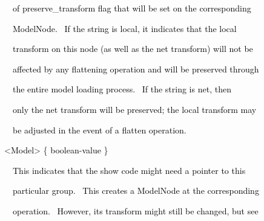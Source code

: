 \documentclass[a4paper]{article}
\newcommand\textstyleOOoComputerKeyWord[1]{\textrm{\textcolor[rgb]{0.0,0.0,0.5019608}{#1}}}
\newcommand\textstyleOOoAssemblerSpecialChar[1]{\textrm{\textcolor[rgb]{0.0,0.5019608,0.0}{#1}}}
\newcommand\textstyleOOoAssemblerIdent[1]{\textrm{\textcolor{black}{#1}}}
\begin{document}
{\color{black}
\textstyleOOoComputerKeyWord{\textcolor{black}{\ \ \ \ of preserve\_transform flag that will be set on the
corresponding}}}

{\color{black}
\textstyleOOoComputerKeyWord{\textcolor{black}{\ \ \ \ ModelNode. \ If the string is
{\textquotedbl}local{\textquotedbl}, it indicates that the local}}}

{\color{black}
\textstyleOOoComputerKeyWord{\textcolor{black}{\ \ \ \ transform on this node (as well as the net transform) will not
be}}}

{\color{black}
\textstyleOOoComputerKeyWord{\textcolor{black}{\ \ \ \ affected by any flattening operation and will be preserved
through}}}

{\color{black}
\textstyleOOoComputerKeyWord{\textcolor{black}{\ \ \ \ the entire model loading process. \ If the string is
{\textquotedbl}net{\textquotedbl}, then}}}

{\color{black}
\textstyleOOoComputerKeyWord{\textcolor{black}{\ \ \ \ only the net transform will be preserved; the local transform
may}}}

{\color{black}
\textstyleOOoComputerKeyWord{\textcolor{black}{\ \ \ \ be adjusted in the event of a flatten operation.}}}


\bigskip

{\color{black}
\textstyleOOoComputerKeyWord{\textcolor{black}{\ \ }}\textstyleOOoAssemblerSpecialChar{{\textless}}\textstyleOOoAssemblerIdent{Model}\textstyleOOoAssemblerSpecialChar{{\textgreater}}\textstyleOOoComputerKeyWord{\textcolor{black}{
}}\textstyleOOoAssemblerSpecialChar{\{}\textstyleOOoComputerKeyWord{\textcolor{black}{
}}\textstyleOOoAssemblerIdent{boolean}\textstyleOOoAssemblerSpecialChar{{}-}\textstyleOOoAssemblerIdent{value}\textstyleOOoComputerKeyWord{\textcolor{black}{
}}\textstyleOOoAssemblerSpecialChar{\}}}


\bigskip

{\color{black}
\textstyleOOoComputerKeyWord{\textcolor{black}{\ \ \ \ This indicates that the show code might need a pointer to this}}}

{\color{black}
\textstyleOOoComputerKeyWord{\textcolor{black}{\ \ \ \ particular group. \ This creates a ModelNode at the
corresponding}}}

\clearpage{\color{black}
\textstyleOOoComputerKeyWord{\textcolor{black}{\ \ \ \ level, which is guaranteed not to be removed by any flatten}}}

{\color{black}
\textstyleOOoComputerKeyWord{\textcolor{black}{\ \ \ \ operation. \ However, its transform might still be changed, but
see}}}
\end{document}
